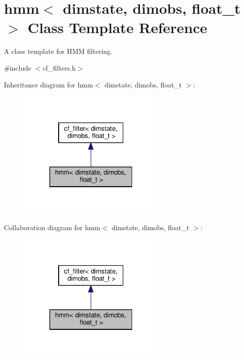 \hypertarget{classhmm}{}\section{hmm$<$ dimstate, dimobs, float\+\_\+t $>$ Class Template Reference}
\label{classhmm}


A class template for H\+MM filtering.  




{\ttfamily \#include $<$cf\+\_\+filters.\+h$>$}



Inheritance diagram for hmm$<$ dimstate, dimobs, float\+\_\+t $>$\+:
\nopagebreak
\begin{figure}[H]
\begin{center}
\leavevmode
\includegraphics[width=205pt]{classhmm__inherit__graph}
\end{center}
\end{figure}


Collaboration diagram for hmm$<$ dimstate, dimobs, float\+\_\+t $>$\+:
\nopagebreak
\begin{figure}[H]
\begin{center}
\leavevmode
\includegraphics[width=205pt]{classhmm__coll__graph}
\end{center}
\end{figure}
